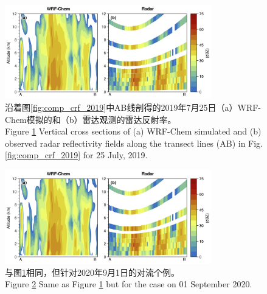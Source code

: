 \begin{figure}[htbp]
\centering
\includegraphics[width=0.8\textwidth]{./figures/comp_dbzcross_2019.png}
\caption{沿着图\ref{fig:comp_crf_2019}中AB线剖得的2019年7月25日（a）WRF-Chem模拟的和（b）雷达观测的雷达反射率。\\
Figure \ref{fig:comp_dbzcross_2019} Vertical cross sections of (a) WRF-Chem simulated and (b) observed radar reflectivity fields along the transect lines (AB) in Fig. \ref{fig:comp_crf_2019} for 25 July, 2019.}
\label{fig:comp_dbzcross_2019}
\end{figure}

\begin{figure}[htbp]
\centering
\includegraphics[width=0.8\textwidth]{./figures/comp_dbzcross_2019.png}
\caption{与图\ref{fig:comp_dbzcross_2019}相同，但针对2020年9月1日的对流个例。\\
Figure \ref{fig:comp_dbzcross_2020} Same as Figure \ref{fig:comp_dbzcross_2019} but for the case on 01 September 2020.}
\label{fig:comp_dbzcross_2020}
\end{figure}


